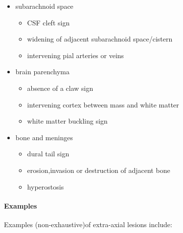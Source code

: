 \begin{itemize}
	\tightlist
	\item
	subarachnoid space
	
	\begin{itemize}
		\tightlist
		\item
		CSF cleft sign
		\item
		widening of adjacent subarachnoid space/cistern
		\item
		intervening pial arteries or veins
	\end{itemize}
	\item
	brain parenchyma
	
	\begin{itemize}
		\tightlist
		\item
		absence of a claw sign
		\item
		intervening cortex between mass and white matter
		\item
		white matter buckling sign
	\end{itemize}
	\item
	bone and meninges
	
	\begin{itemize}
		\tightlist
		\item
		dural tail sign
		\item
		erosion,invasion or destruction of adjacent bone
		\item
		hyperostosis
	\end{itemize}
\end{itemize}

\paragraph{Examples}

Examples (non-exhaustive)of extra-axial lesions include:

